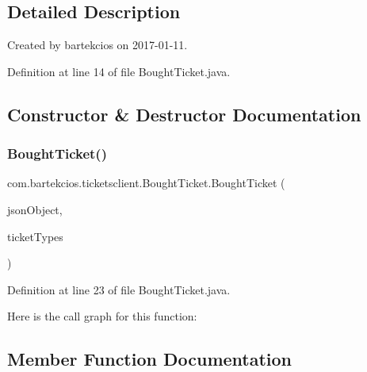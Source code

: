 \subsection{Detailed Description}
Created by bartekcios on 2017-\/01-\/11. 

Definition at line 14 of file Bought\+Ticket.\+java.



\subsection{Constructor \& Destructor Documentation}
\mbox{\label{classcom_1_1bartekcios_1_1ticketsclient_1_1_bought_ticket_ae17121a3a3e70f1eb01341241203d3ee}} 
\subsubsection{\texorpdfstring{Bought\+Ticket()}{BoughtTicket()}}
{\footnotesize\ttfamily com.\+bartekcios.\+ticketsclient.\+Bought\+Ticket.\+Bought\+Ticket (\begin{DoxyParamCaption}\item[{J\+S\+O\+N\+Object}]{json\+Object,  }\item[{List$<$ \hyperlink{classcom_1_1bartekcios_1_1ticketsclient_1_1_ticket_type}{Ticket\+Type} $>$}]{ticket\+Types }\end{DoxyParamCaption})}



Definition at line 23 of file Bought\+Ticket.\+java.

Here is the call graph for this function\+:


\subsection{Member Function Documentation}
\mbox{\label{classcom_1_1bartekcios_1_1ticketsclient_1_1_bought_ticket_a83bbd284879fcc52e9c1a53e104a2ea4}} 
